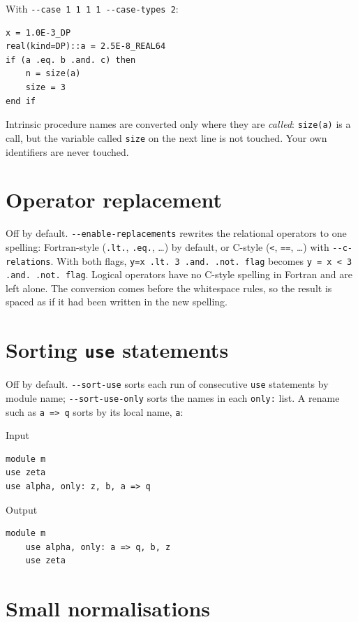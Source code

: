 \documentclass[11pt,a4paper,openany]{book}
\newcommand{\code}[1]{\texttt{\small #1}}
\newcommand{\flag}[1]{\texttt{\small -{}-#1}}
\newenvironment{beforecol}{\noindent\begin{minipage}[t]{0.485\linewidth}\textsf{\footnotesize\color{commentc}Input}}{\end{minipage}\hfill}
\newenvironment{aftercol}{\begin{minipage}[t]{0.485\linewidth}\textsf{\footnotesize\color{commentc}Output}}{\end{minipage}\par\medskip}
\begin{document}
With \code{-{}-case 1 1 1 1 -{}-case-types 2}:

\begin{lstlisting}[style=after]
x = 1.0E-3_DP
real(kind=DP)::a = 2.5E-8_REAL64
if (a .eq. b .and. c) then
    n = size(a)
    size = 3
end if
\end{lstlisting}

Intrinsic procedure names are converted only where they are \emph{called}:
\code{size(a)} is a call, but the variable called \code{size} on the next line
is not touched. Your own identifiers are never touched.

\section{Operator replacement}

Off by default. \flag{enable-replacements} rewrites the relational operators to one
spelling: Fortran-style (\code{.lt.}, \code{.eq.}, \ldots) by default, or
C-style (\code{<}, \code{==}, \ldots) with \flag{c-relations}. With both flags,
\code{y=x .lt. 3 .and. .not. flag} becomes \code{y = x < 3 .and. .not. flag}.
Logical operators have no C-style spelling in Fortran and are left alone.
The conversion comes before the whitespace rules, so the result is spaced as
if it had been written in the new spelling.

\section{Sorting \texttt{use} statements}

Off by default. \flag{sort-use} sorts each run of consecutive \code{use}
statements by module name; \flag{sort-use-only} sorts the names in each
\code{only:} list. A rename such as \code{a => q} sorts by its local name,
\code{a}:

\begin{beforecol}
\begin{lstlisting}[style=before]
module m
use zeta
use alpha, only: z, b, a => q
\end{lstlisting}
\end{beforecol}
\begin{aftercol}
\begin{lstlisting}[style=after]
module m
    use alpha, only: a => q, b, z
    use zeta
\end{lstlisting}
\end{aftercol}

\section{Small normalisations}
\end{document}
